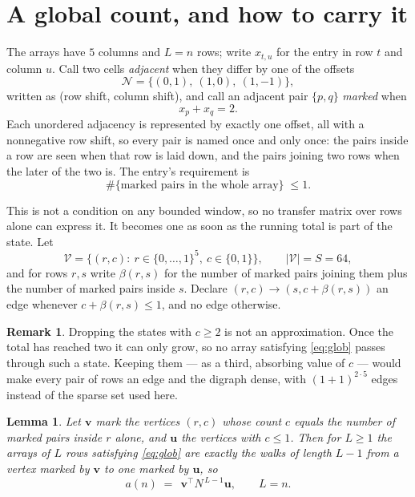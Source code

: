 \documentclass[11pt,a4paper]{article}
\theoremstyle{plain}
\newtheorem{lemma}[theorem]{Lemma}
\theoremstyle{definition}
\newtheorem{remark}[theorem]{Remark}
\begin{document}
\section{A global count, and how to carry it}

The arrays have $5$ columns and $L=n$ rows; write $x_{t,u}$ for the entry in
row $t$ and column $u$. Call two cells \emph{adjacent} when they differ by one of the
offsets
\[
\mathcal N=\{(0,1),\ (1,0),\ (1,-1)\},
\]
written as (row shift, column shift), and call an adjacent pair $\{p,q\}$
\emph{marked} when
\[
x_{p}+x_{q}=2 .
\]
Each unordered adjacency is represented by exactly one offset, all with a nonnegative row
shift, so every pair is named once and only once: the pairs inside a row are seen when
that row is laid down, and the pairs joining two rows when the later of the two is. The
entry's requirement is
\begin{equation}\label{eq:glob}
\#\{\text{marked pairs in the whole array}\}\;\le1.
\end{equation}

This is not a condition on any bounded window, so no transfer matrix over rows alone can
express it. It becomes one as soon as the running total is part of the state. Let
\[
\mathcal V=\bigl\{(r,c):\ r\in\{0,\dots,1\}^{5},\ c\in\{0,1\}\bigr\},
\qquad |\mathcal V|=S=64,
\]
and for rows $r,s$ write $\beta(r,s)$ for the number of marked pairs joining them plus the
number of marked pairs inside $s$. Declare $(r,c)\to(s,c+\beta(r,s))$ an edge whenever
$c+\beta(r,s)\le1$, and no edge otherwise.

\begin{remark}
Dropping the states with $c\ge2$ is not an approximation. Once the total has reached two it
can only grow, so no array satisfying \eqref{eq:glob} passes through such a state. Keeping
them --- as a third, absorbing value of $c$ --- would make every pair of rows an edge and
the digraph dense, with $(1+1)^{2\cdot5}$ edges instead of the sparse set used here.
\end{remark}

\begin{lemma}\label{lem:walk}
Let $\mathbf{v}$ mark the vertices $(r,c)$ whose count $c$ equals the number of marked pairs
inside $r$ alone, and $\mathbf{u}$ the vertices with $c\le1$. Then for $L\ge1$ the arrays
of $L$ rows satisfying \eqref{eq:glob} are exactly the walks of length $L-1$ from a
vertex marked by $\mathbf{v}$ to one marked by $\mathbf{u}$, so
\[
a(n)\;=\;\,\mathbf{v}^{\!\top}N^{\,L-1}\mathbf{u},\qquad L=n .
\]
\end{lemma}
\end{document}
